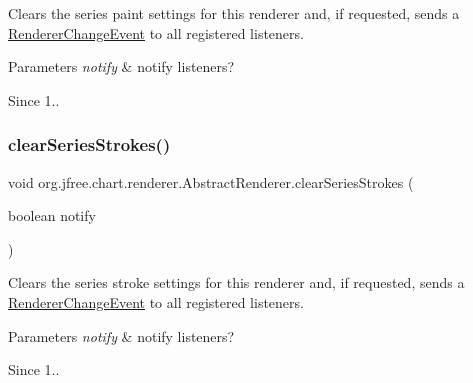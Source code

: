 Clears the series paint settings for this renderer and, if requested, sends a \mbox{\hyperlink{}{Renderer\+Change\+Event}} to all registered listeners.


\begin{DoxyParams}{Parameters}
{\em notify} & notify listeners?\\
\hline
\end{DoxyParams}
\begin{DoxySince}{Since}
1.. 
\end{DoxySince}
\mbox{\label{classorg_1_1jfree_1_1chart_1_1renderer_1_1_abstract_renderer_a229c7ac9859bddca844b7219b563bb96}} 
\subsubsection{\texorpdfstring{clear\+Series\+Strokes()}{clearSeriesStrokes()}}
{\footnotesize\ttfamily void org.\+jfree.\+chart.\+renderer.\+Abstract\+Renderer.\+clear\+Series\+Strokes (\begin{DoxyParamCaption}\item[{boolean}]{notify }\end{DoxyParamCaption})}

Clears the series stroke settings for this renderer and, if requested, sends a \mbox{\hyperlink{}{Renderer\+Change\+Event}} to all registered listeners.


\begin{DoxyParams}{Parameters}
{\em notify} & notify listeners?\\
\hline
\end{DoxyParams}
\begin{DoxySince}{Since}
1.. 
\end{DoxySince}
\mbox{\label{classorg_1_1jfree_1_1chart_1_1renderer_1_1_abstract_renderer_a6c01c84fe469a7d5d06bfd268828cd7b}} 
